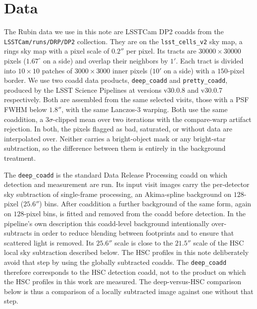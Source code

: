 \documentclass[SE,lsstdraft,authoryear,toc]{lsstdoc}
\begin{document}
\section{Data} \label{sec:data}
The Rubin data we use in this note are LSSTCam DP2 coadds from the \texttt{LSSTCam/runs/DRP/DP2} collection. They are on the \texttt{lsst\_cells\_v2} sky map, a rings sky map with a pixel scale of $0.2''$ per pixel. Its tracts are $30000 \times 30000$ pixels ($1.67^\circ$ on a side) and overlap their neighbors by $1'$. Each tract is divided into $10 \times 10$ patches of $3000 \times 3000$ inner pixels ($10'$ on a side) with a $150$-pixel border. We use two coadd data products, \texttt{deep\_coadd} and \texttt{pretty\_coadd}, produced by the LSST Science Pipelines at versions v30.0.8 and v30.0.7 respectively. Both are assembled from the same selected visits, those with a PSF FWHM below $1.8''$, with the same Lanczos-3 warping. Both use the same coaddition, a $3\sigma$-clipped mean over two iterations with the compare-warp artifact rejection. In both, the pixels flagged as bad, saturated, or without data are interpolated over. Neither carries a bright-object mask or any bright-star subtraction, so the difference between them is entirely in the background treatment. 

The \texttt{deep\_coadd} is the standard Data Release Processing coadd on which detection and measurement are run. Its input visit images carry the per-detector sky subtraction of single-frame processing, an Akima-spline background on $128$-pixel ($25.6''$) bins. After coaddition a further background of the same form, again on $128$-pixel bins, is fitted and removed from the coadd before detection. In the pipeline's own description this coadd-level background intentionally over-subtracts in order to reduce blending between footprints and to ensure that scattered light is removed. Its $25.6''$ scale is close to the $21.5''$ scale of the HSC local sky subtraction described below. The HSC profiles in this note deliberately avoid that step by using the globally subtracted coadds. The \texttt{deep\_coadd} therefore corresponds to the HSC detection coadd, not to the product on which the HSC profiles in this work are measured. The deep-versus-HSC comparison below is thus a comparison of a locally subtracted image against one without that step. 
\end{document}
